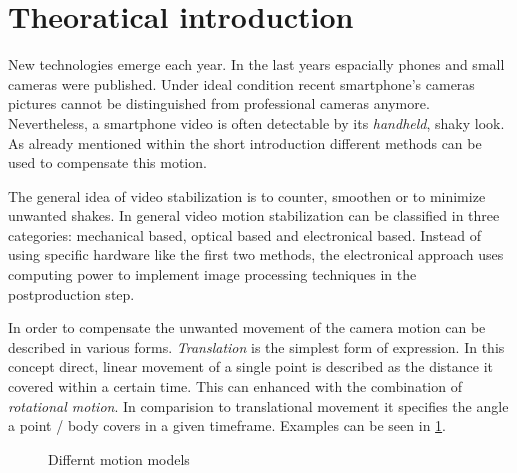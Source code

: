 \section{Theoratical introduction}
New technologies emerge each year. In the last years espacially phones and small cameras were published. Under ideal condition recent smartphone's cameras pictures cannot be distinguished from professional cameras anymore. Nevertheless, a smartphone video is often detectable by its \textit{handheld}, shaky look. As already mentioned within the short introduction different methods can be used to compensate this motion.

The general idea of video stabilization is to counter, smoothen or to minimize unwanted shakes. In general video motion stabilization can be classified in three categories: mechanical based, optical based and electronical based. Instead of using specific hardware like the first two methods, the electronical approach uses computing power to implement image processing techniques in the  postproduction step. \cite{blockTang}

In order to compensate the unwanted movement of the camera motion can be described in various forms. \textit{Translation} is the simplest form of expression. In this concept direct, linear movement of a single point is described as the distance it covered within a certain time. This can enhanced with the combination of \textit{rotational motion}.  In comparision to translational movement it specifies the angle a point / body covers in a given timeframe. Examples can be seen in \cref{fig:motionmodels}.
\begin{figure}\centering
    \begin{minipage}{.45\textwidth}\centering
    \end{minipage}
    \begin{minipage}{.45\textwidth}\centering
    \end{minipage}
    \caption{Differnt motion models}
    \label{fig:motionmodels}
\end{figure}


